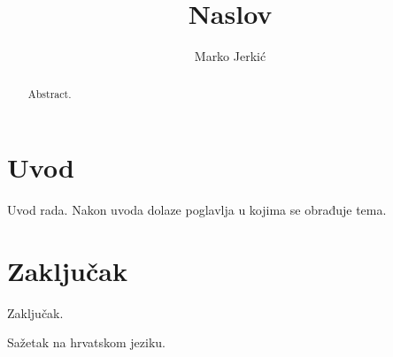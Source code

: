 \documentclass[times, utf8, zavrsni]{fer}
\begin{document}

\title{Naslov}

\author{Marko Jerkić}


\izvornik

\zahvala{}

\tableofcontents

\chapter{Uvod}
Uvod rada. Nakon uvoda dolaze poglavlja u kojima se obrađuje tema.

\chapter{Zaključak}
Zaključak.




\begin{sazetak}
Sažetak na hrvatskom jeziku.

\end{sazetak}

\begin{abstract}
Abstract.

\end{abstract}
\end{document}
